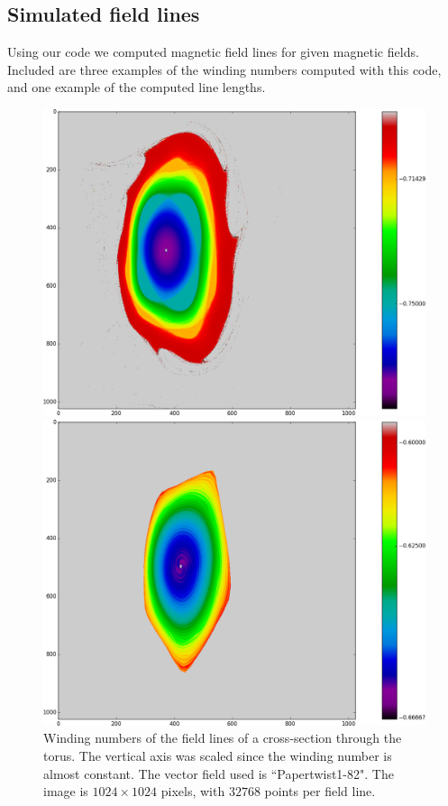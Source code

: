 \documentclass{article}
\begin{document}
\subsection{Simulated field lines}
Using our code we computed magnetic field lines for given magnetic fields. Included are three examples of the winding numbers computed with this code, and one example of the computed line lengths.


\begin{figure}[!htb]
  \includegraphics[width=\linewidth]{Figures/Rings_Papertwist_twist1_82_steps32k.png}
  \caption{Winding numbers of the field lines of a cross-section through the torus. The vertical axis was scaled since the winding number is almost constant. The vector field used is ``Papertwist1-82". The image is $1024\times 1024$ pixels, with $32768$ points per field line.}\label{fig:82-32k}
\endminipage\hfill
{}
  \includegraphics[width=\linewidth]{Figures/Rings_Papertwist_twist1_125_steps8k.png}

\end{figure}
\end{document}
